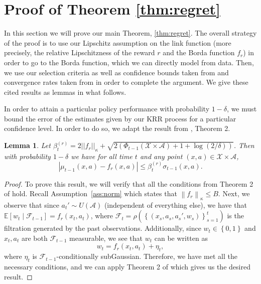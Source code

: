 \documentclass{article} \usepackage{iclr2023_conference,times}
\newcommand{\Contextspace}{\mathcal{X}}
\newcommand{\Actionspace}{\mathcal{A}}
\newcommand{\bonus}{\beta_t^{(r)}}
\newcommand{\kernel}{\kappa}
\newcommand{\add}[1]{#1}
\newcommand{\linkfunction}{\add{\rho}}
\newtheorem{lemma}[theorem]{Lemma}
\begin{document}
\section{Proof of Theorem \ref{thm:regret}}
\label{a:regret_proof}
In this section we will prove our main Theorem, \ref{thm:regret}. The overall strategy of the proof is to use our Lipschitz assumption on the link function (more precisely, the relative Lipschitzness of the reward $r$ and the Borda function $f_r$) in order to go to the Borda function, which we can directly model from data. Then, we use our selection criteria as well as confidence bounds taken from \citet{chowdhury2017kernelized} and convergence rates taken from \citet{kandasamy2019multi} in order to complete the argument. We give these cited results as lemmas in what follows.

In order to attain a particular policy performance with probability $1 - \delta$, we must bound the error of the estimates given by our KRR process for a particular confidence level.
In order to do so, we adapt the result from \citet{chowdhury2017kernelized}, Theorem 2.
\begin{lemma}
    \label{lem:confidence_bounds}
    Let $\bonus = 2||f_r||_{\kernel} + \sqrt{2(\Phi_{t-1}(\Contextspace \times \Actionspace) + 1 + \log(2 / \delta))}$.
    Then with probability $1 - \delta$ we have for all time $t$ and any point $\left( x, a \right) \in \Contextspace \times \Actionspace$,
    \[|\mu_{t-1}(x, a) - f_r(x,a )| \leq \bonus \sigma_{t-1}(x, a).\]
\end{lemma}

\begin{proof}
    To prove this result, we will verify that all the conditions from Theorem 2 of \citet{chowdhury2017kernelized} hold.
    Recall Assumption~\ref{ass:norm} which states that $ \left \lVert f_r \right \rVert_{\kernel} \leq B$.
    Next, we observe that since $a_t' \sim U \left( \Actionspace \right)$ (independent of everything else), we have that $ \mathbb{E} \left[ w_t \mid \mathcal{F}_{t - 1} \right] = f_r(x_t, a_t)$, where $ \mathcal{F}_t = \linkfunction \left( \left\{ \left( x_s, a_s, a_s', w_s \right) \right\}_{s = 1}^{t} \right)$ is the filtration generated by the past observations.
    Additionally, since $w_t \in \left\{ 0, 1 \right\}$ and $x_t, a_t$ are both $ \mathcal{F}_{t - 1}$ measurable, we see that $w_t$ can be written as
    \begin{equation*}
        w_t = f_r(x_t, a_t) + \eta_t,
    \end{equation*}
    where $\eta_t$ is $ \mathcal{F}_{t - 1}$-conditionally subGaussian.
    Therefore, we have met all the necessary conditions, and we can apply Theorem 2 of \citet{chowdhury2017kernelized} which gives us the desired result.
\end{proof}
\end{document}
